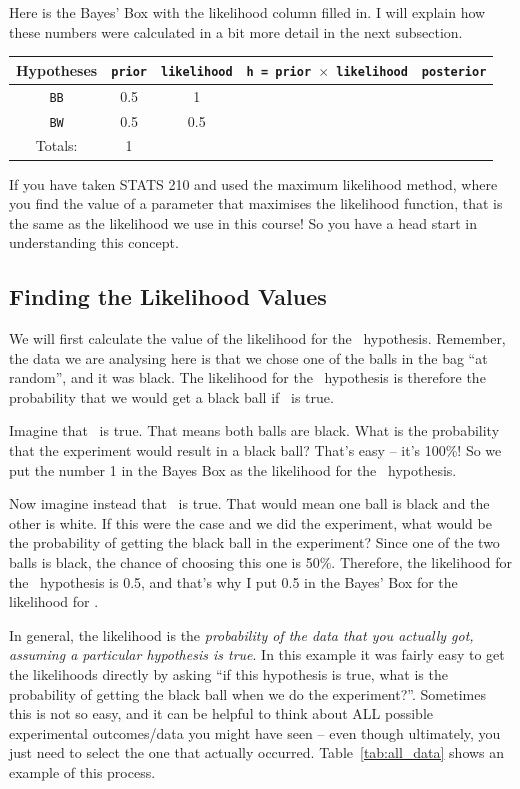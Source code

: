 Here is the Bayes' Box with the likelihood column filled in. I will explain
how these numbers were calculated in a bit more detail in the next subsection.
\begin{table}[ht!]
\begin{center}
\begin{tabular}{|c|c|c|c|c|}
\hline
{\bf Hypotheses} & {\tt prior} & {\tt likelihood} &
{\tt h = prior $\times$ likelihood} & {\tt posterior}\\
\hline
{\tt BB} & 0.5 & 1 &  & \\
{\tt BW} & 0.5 & 0.5 &  & \\
\hline
Totals: & 1 & & & \\
\hline
\end{tabular}
\end{center}
\end{table}
If you have taken STATS 210 and used the maximum likelihood method, where you
find the value of a parameter that maximises the likelihood function, that is
the same as the likelihood we use in this course! So you have a head start
in understanding this concept.

\subsection{Finding the Likelihood Values}
We will first calculate the value of the likelihood for the \bb~hypothesis.
Remember, the data we are analysing here is that we chose one of the balls in
the bag ``at random'', and it was black. The likelihood for the \bb~hypothesis is
therefore the probability that we would get a black ball if \bb~is true.

Imagine that \bb~is true. That means both balls are black. What is the probability that
the experiment would result in a black ball? That's easy -- it's 100\%! So we
put the number 1 in the Bayes Box as the likelihood for the \bb~hypothesis.

Now imagine instead that \bw~is true. That would mean one ball is black and the
other is white. If this were the case and we did the experiment, what would be
the probability of getting the black ball in the experiment? Since one of the
two balls is black, the chance of choosing this one is 50\%. Therefore, the
likelihood for the \bw~hypothesis is 0.5, and that's why I put 0.5 in the Bayes'
Box for the likelihood for \bw.

In general, the likelihood is the {\it probability of the data that you actually
got, assuming a particular hypothesis is true}. In this example it was
fairly easy to get the likelihoods directly by asking ``if this hypothesis
is true, what is the probability of getting the black ball when we do the
experiment?''. Sometimes this is not so easy, and it can be helpful to think about
ALL possible experimental outcomes/data you might have seen -- even though
ultimately, you just need to select the one that actually occurred.
Table~\ref{tab:all_data} shows an example of this process.

